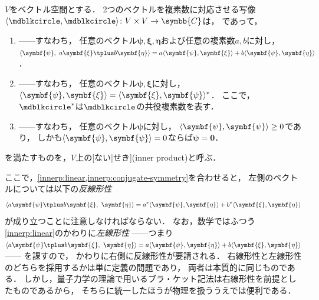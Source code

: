 \documentclass[
]{sotsu}
\newcommand{\bpsi}{\symbf{\psi}}
\newcommand{\bxi}{\symbf{\xi}}
\newcommand{\beeta}{\symbf{\eta}}
\newcommand{\fire}[1]{\textcolor{fire}{#1}}
\begin{document}
$V$をベクトル空間とする．
2つのベクトルを複素数に対応させる写像$\iparen{\bigdot, \bigdot} \colon V \times V \to \symbb{C}$は，
であって，
\begin{enumerate}
    \item \label{innerp:linear} 
        ------すなわち，
        \fire{任意のベクトル$\bpsi, \bxi, \beeta$}および\fire{任意の複素数$a, b$}に対し，
        $\iparen{\bpsi, \  a \bxi \vecplus b \beeta} = a \iparen{\bpsi, \bxi} + b \iparen{\bpsi, \beeta}$．
    \item \label{innerp:conjugate-symmetry} 
        ------すなわち，
        \fire{任意のベクトル$\bpsi, \bxi$}に対し，
        $\iparen{\bpsi, \bxi} = \conj{\iparen{\bxi, \bpsi}}$．
        ここで，$\conj{\bigdot}$は$\bigdot$の共役複素数を表す．
    \item \label{innerp:positive-definiteness}
        ------すなわち，
        \fire{任意のベクトル$\bpsi$}に対し，
        $\iparen{\bpsi, \bpsi} \geq 0$であり，
        しかも$\iparen{\bpsi, \bpsi} = 0$ならば$\bpsi = \symbf{0}$．
\end{enumerate}
を満たすものを，$V$上の[ない|せき](inner product)と呼ぶ．

ここで，\cref*{innerp:linear,innerp:conjugate-symmetry}を合わせると，
左側のベクトルについては以下の\emph{反線形性}
\begin{equation}
    \label{eq:anti-linear}
    \iparen{a \bpsi \vecplus b \bxi, \  \beeta}
        = \conj{a} \iparen{\bpsi, \beeta} + \conj{b} \iparen{\bxi, \beeta}
\end{equation}
が成り立つことに注意しなければならない．
なお，数学ではふつう\cref{innerp:linear}のかわりに\emph{左線形性}%
------つまり\(
    \iparen{a \bpsi \vecplus b \bxi, \  \beeta}
    = a \iparen{\bpsi, \beeta} + b \iparen{\bxi, \beeta}
\)------%
を課すので，
かわりに右側に反線形性が要請される．
右線形性と左線形性のどちらを採用するかは単に定義の問題であり，
両者は本質的に同じものである．
しかし，量子力学の理論で用いるブラ・ケット記法は右線形性を前提としたものであるから，
そちらに統一したほうが物理を扱ううえでは便利である．
\end{document}
